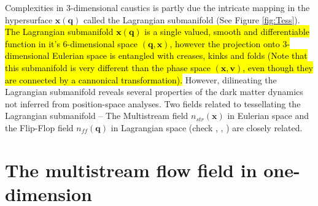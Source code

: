  
Complexities in 3-dimensional caustics is partly due the intricate mapping in the hypersurface $\mathbf{x}(\mathbf{q})$ called the Lagrangian submanifold (See Figure \ref{fig:Tess}). 
\hl{The Lagrangian submanifold $\mathbf{x}(\mathbf{q})$  is a single valued, smooth and differentiable function in it's 6-dimensional space $(\mathbf{q}, \mathbf{x})$, however the projection onto 3-dimensional Eulerian space is entangled with creases, kinks and folds (Note that this  submanifold is very different than the phase space $(\mathbf{x},\mathbf{v})$, even though they are connected by a cannonical transformation).} However, dilineating the Lagrangian submanifold reveals several properties of the dark matter dynamics not inferred from position-space analyses. Two fields related to tessellating the Lagrangian submanifold -- The Multistream field $n_{str}(\mathbf{x})$ in Eulerian space and the Flip-Flop field $n_{ff}(\mathbf{q})$ in Lagrangian space (check \cite{Shandarin2012}, \cite{Ramachandra2015}, \cite{Shandarin2016}) are closely related. 


\section{The multistream flow field in one-dimension}
\label{appendix:nstream}

